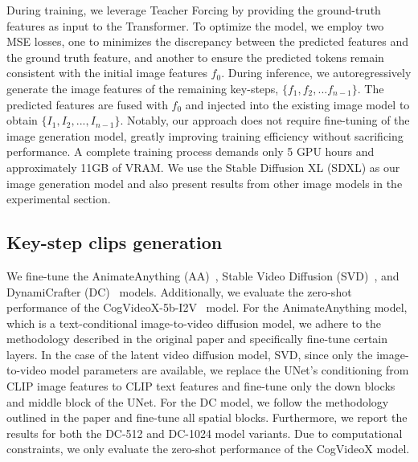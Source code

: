 During training, we leverage Teacher Forcing by providing the ground-truth features as input to the Transformer. To optimize the model, we employ two MSE losses, one to minimizes the discrepancy between the predicted features and the ground truth feature, and another to ensure the predicted tokens remain consistent with the initial image features $f_0$.
During inference, we autoregressively generate the image features of the remaining key-steps, $\{f_1,f_2,...f_{n-1}\}$. The predicted features are fused with $f_0$ and injected into the existing image model to obtain $\{I_1, I_2,...,I_{n-1}\}$. Notably, our approach does not require fine-tuning of the image generation model, greatly improving training efficiency without sacrificing performance. A complete training process demands only 5 GPU hours and approximately 11GB of VRAM. We use the Stable Diffusion XL (SDXL) as our image generation model and also present results from other image models in the experimental section. 

\subsection{Key-step clips generation}
\label{video generation}
We fine-tune the AnimateAnything (AA)~\cite{aa}, Stable Video Diffusion (SVD)~\cite{SVD}, and DynamiCrafter (DC)~\cite{dynamicrafter} models. Additionally, we evaluate the zero-shot performance of the CogVideoX-5b-I2V~\cite{cogvideox} model. For the AnimateAnything model, which is a text-conditional image-to-video diffusion model, we adhere to the methodology described in the original paper and specifically fine-tune certain layers. In the case of the latent video diffusion model, SVD, since only the image-to-video model parameters are available, we replace the UNet’s conditioning from CLIP image features to CLIP text features and fine-tune only the down blocks and middle block of the UNet. For the DC model, we follow the methodology outlined in the paper and fine-tune all spatial blocks. Furthermore, we report the results for both the DC-512 and DC-1024 model variants. Due to computational constraints, we only evaluate the zero-shot performance of the CogVideoX model.
